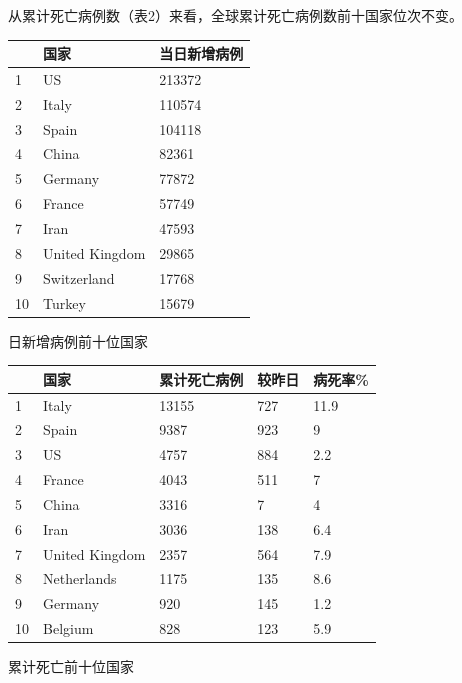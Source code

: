\documentclass[]{article}
\begin{document}
从累计死亡病例数（表2）来看，全球累计死亡病例数前十国家位次不变。

\begin{minipage}{\textwidth}\small
        \begin{minipage}[H]{0.3\textwidth}
        \centering
           \begin{tabular}{@{}lll@{}}
            \toprule
               & 国家             & 当日新增病例 \\ \midrule
            1  & US             & 213372 \\
            2  & Italy          & 110574 \\
            3  & Spain          & 104118 \\
            4  & China          & 82361  \\
            5  & Germany        & 77872  \\
            6  & France         & 57749  \\
            7  & Iran           & 47593  \\
            8  & United Kingdom & 29865  \\
            9  & Switzerland    & 17768  \\
            10 & Turkey         & 15679  \\ \bottomrule
            \end{tabular}
            \makeatletter{}\makeatother\caption{日新增病例前十位国家}
        \end{minipage}
        \begin{minipage}[H]{0.65\textwidth}
        \centering
           \begin{tabular}{@{}lllll@{}}
          \toprule
             & 国家             & 累计死亡病例 & 较昨⽇ & 病死率\% \\           \midrule
          1  & Italy          & 13155  & 727 & 11.9  \\
          2  & Spain          & 9387   & 923 & 9     \\
          3  & US             & 4757   & 884 & 2.2   \\
          4  & France         & 4043   & 511 & 7     \\
          5  & China          & 3316   & 7   & 4     \\
          6  & Iran           & 3036   & 138 & 6.4   \\
          7  & United Kingdom & 2357   & 564 & 7.9   \\
          8  & Netherlands    & 1175   & 135 & 8.6   \\
          9  & Germany        & 920    & 145 & 1.2   \\
          10 & Belgium        & 828    & 123 & 5.9   \\ \bottomrule
          \end{tabular}
      \makeatletter{}\makeatother\caption{累计死亡前十位国家}
    \end{minipage}
\end{minipage}
\end{document}

